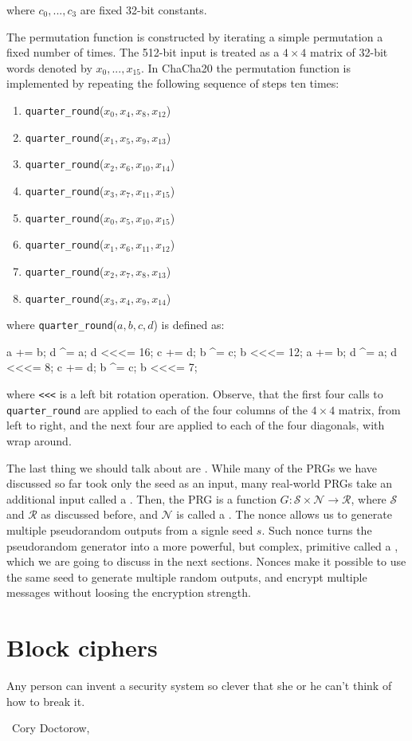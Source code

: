 \documentclass[a4paper,10pt]{article}
\makeatletter
\newcommand{\cll}[1]{\mathcal{#1}}
\newenvironment{epigraph}[1]
{\def\epigraph@quoteauthor{#1}%
  \itshape\list{}{\rightmargin\leftmargin}\item\relax}
{\endlist\par\normalfont\hfill\ \epigraph@quoteauthor\hspace*{\@tempdima}\par\bigskip}
\newenvironment{code}{\list{}{\rightmargin\leftmargin}\item\relax\endgraf\verbatim}{\endverbatim\endlist}
\makeatother
\begin{document}
where $c_0, ..., c_3$ are fixed 32-bit constants.

The permutation function is constructed by iterating a simple permutation a
fixed number of times. The 512-bit input is treated as a $4 \times 4$ matrix of
32-bit words denoted by $x_0, ..., x_{15}$. In ChaCha20 the permutation function
is implemented by repeating the following sequence of steps ten times:

\begin{multicols}{2}
  \begin{enumerate}
    \setlength\itemsep{1pt}
  \item \verb|quarter_round|($x_{0}, x_{4}, x_{8}, x_{12}$)
  \item \verb|quarter_round|($x_{1}, x_{5}, x_{9}, x_{13}$)
  \item \verb|quarter_round|($x_{2}, x_{6}, x_{10}, x_{14}$)
  \item \verb|quarter_round|($x_{3}, x_{7}, x_{11}, x_{15}$)
  \item \verb|quarter_round|($x_{0}, x_{5}, x_{10}, x_{15}$)
  \item \verb|quarter_round|($x_{1}, x_{6}, x_{11}, x_{12}$)
  \item \verb|quarter_round|($x_{2}, x_{7}, x_{8}, x_{13}$)
  \item \verb|quarter_round|($x_{3}, x_{4}, x_{9}, x_{14}$)
  \end{enumerate}
\end{multicols}

where \verb|quarter_round|($a, b, c, d$) is defined as:

\begin{code}
  a += b; d ^= a; d <<<= 16;
  c += d; b ^= c; b <<<= 12;
  a += b; d ^= a; d <<<= 8;
  c += d; b ^= c; b <<<= 7;
\end{code}

where \verb|<<<| is a left bit rotation operation. Observe, that the first four
calls to \verb|quarter_round| are applied to each of the four columns of the
$4 \times 4$ matrix, from left to right, and the next four are applied to each
of the four diagonals, with wrap around.

The last thing we should talk about are . While many of the PRGs we
have discussed so far took only the seed as an input, many real-world PRGs take
an additional input called a . Then, the PRG is a function $G : \cll{S} \times \cll{N} \to \cll{R}$,
where $\cll{S}$ and $\cll{R}$ as discussed before, and $\cll{N}$ is called a
. The nonce allows us to generate multiple pseudorandom outputs
from a signle seed $s$. Such nonce turns the pseudorandom generator into a more
powerful, but complex, primitive called a , which we
are going to discuss in the next sections. Nonces make it possible to use the
same seed to generate multiple random outputs, and encrypt multiple messages
without loosing the encryption strength.

\section{Block ciphers}

\begin{epigraph}{Cory Doctorow, \itl{Schneier's Law}}
  Any person can invent a security system so clever that she or he can’t think
  of how to break it.
\end{epigraph}
\end{document}
